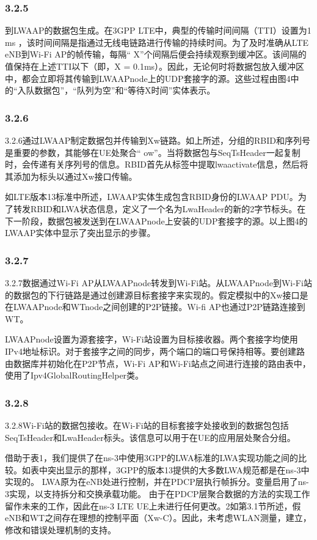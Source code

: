 \subsubsection*{3.2.5}
到LWAAP的数据包生成。在3GPP LTE中，典型的传输时间间隔（TTI）设置为1 ms \cite{LTE}，该时间间隔是指通过无线电链路进行传输的持续时间。为了及时准确从LTE eNB到Wi-Fi AP的帧传输，每隔“ X”个间隔后便会持续观察到缓冲区。该间隔的值保持在上述TTI以下（即，X = 0.1ms）。因此，无论何时将数据包放入缓冲区中，都会立即将其传输到LWAAPnode上的UDP套接字的源。这些过程由图4中的“入队数据包”，“队列为空”和“等待X时间”实体表示。

\subsubsection*{3.2.6}
3.2.6通过LWAAP制定数据包并传输到Xw链路。如上所述，分组的RBID和序列号是重要的参数，其能够在UE处聚合“ ow”。当将数据包与SeqTsHeader一起复制时，会传递有关序列号的信息。RBID首先从标签中提取lwaactivate信息，然后将其添加为标头以通过Xw接口传输。

如LTE版本13标准中所述，LWAAP实体生成包含RBID身份的LWAAP PDU。为了转发RBID和LWA状态信息，定义了一个名为LwaHeader的新的2字节标头。在下一阶段，数据包被发送到在LWAAPnode上安装的UDP套接字的源。以上图4的LWAAP实体中显示了突出显示的步骤。

\subsubsection*{3.2.7}
3.2.7数据通过Wi-Fi AP从LWAAPnode转发到Wi-Fi站。从LWAAPnode到Wi-Fi站的数据包的下行链路是通过创建源目标套接字来实现的。假定模拟中的Xw接口是在LWAAPnode和WTnode之间创建的P2P链接。Wi-fi AP也通过P2P链路连接到WT。

LWAAPnode设置为源套接字，Wi-Fi站设置为目标接收器。两个套接字均使用IPv4地址标识。对于套接字之间的同步，两个端口的端口号保持相等。要创建路由数据库并初始化在P2P节点，Wi-Fi AP和Wi-Fi站点之间进行连接的路由表中，使用了Ipv4GlobalRoutingHelper类。

\subsubsection*{3.2.8}
3.2.8Wi-Fi站的数据包接收。在Wi-Fi站的目标套接字处接收到的数据包包括SeqTsHeader和LwaHeader标头。该信息可以用于在UE的应用层处聚合分组。

借助于表1，我们提供了在ns-3中使用3GPP的LWA标准的LWA实现功能之间的比较。如表中突出显示的那样，3GPP的版本13提供的大多数LWA规范都是在ns-3中实现的。
LWA原为在eNB处进行控制，并在PDCP层执行帧拆分。变量启用了ns-3实现，以支持拆分和交换承载功能。
由于在PDCP层聚合数据的方法的实现工作留作未来的工作，因此在ns-3 LTE UE上未进行任何更改。2如第3.1节所述，假eNB和WT之间存在理想的控制平面（Xw-C）。因此，未考虑WLAN测量，建立，修改和错误处理机制的支持。


